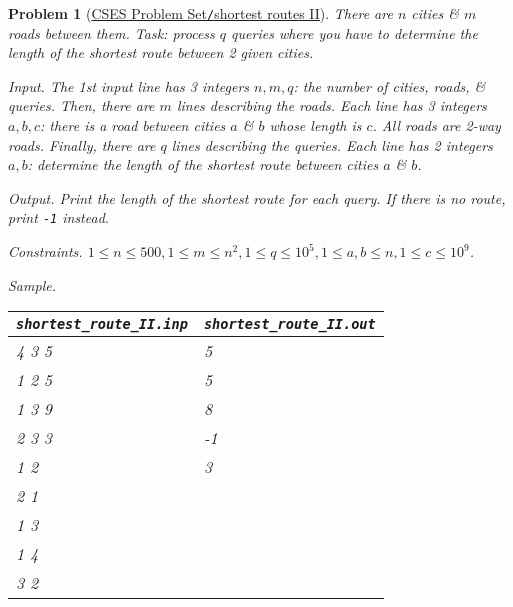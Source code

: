 \documentclass{article}
\newtheorem{problem}{Problem}
\begin{document}
\begin{problem}[\href{https://cses.fi/problemset/task/1672}{CSES Problem Set{\tt/}shortest routes II}]
	There are $n$ cities \& $m$ roads between them. Task: process $q$ queries where you have to determine the length of the shortest route between 2 given cities.
	\item {\sf Input.} The 1st input line has 3 integers $n,m,q$: the number of cities, roads, \& queries. Then, there are $m$ lines describing the roads. Each line has 3 integers $a,b,c$: there is a road between cities $a$ \& $b$ whose length is $c$. All roads are 2-way roads. Finally, there are $q$ lines describing the queries. Each line has 2 integers $a,b$: determine the length of the shortest route between cities $a$ \& $b$.
	\item {\sf Output.} Print the length of the shortest route for each query. If there is no route, print {\tt-1} instead.
	\item {\sf Constraints.} $1\le n\le500,1\le m\le n^2,1\le q\le10^5,1\le a,b\le n,1\le c\le10^9$.
	\item {\sf Sample.}
	\begin{table}[H]
		\centering
		\begin{tabular}{|l|l|}
			\hline
			\verb|shortest_route_II.inp| & \verb|shortest_route_II.out| \\
			\hline
			4 3 5 & 5 \\
			1 2 5 & 5 \\
			1 3 9 & 8 \\
			2 3 3 & -1 \\
			1 2 & 3 \\
			2 1 & \\
			1 3 & \\
			1 4 & \\
			3 2 & \\
			\hline
		\end{tabular}
	\end{table}
\end{problem}
\end{document}
